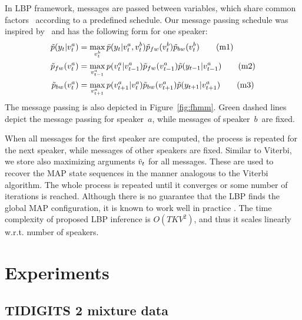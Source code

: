 \documentclass[a4paper]{article}
\newcommand{\spkrA}{a}
\newcommand{\spkrB}{b}
\def\p{{\bar p}}
\begin{document}
In LBP framework, messages are passed between variables, which share common factors~\cite{Bishop2006} according to a predefined schedule. Our message passing schedule was inspired by~\cite{Rennie2010} and has the following form for one speaker:
\begin{align*}
    \Tilde{p}(y_t | v_t^{\spkrA}) &= \max_{v_{t}^{\spkrB}}  \p(y_t | v_t^{\spkrA}, v_t^{\spkrB}) \Tilde{p}_{fw}(v_t^{\spkrB})     \Tilde{p}_{bw}(v_t^{\spkrB})          \tag{m1}\\
    \Tilde{p}_{fw}(v_t^{\spkrA})  &= \max_{v_{t-1}^{\spkrA}} p(v_t^{\spkrA} | v_{t-1}^{\spkrA}) \Tilde{p}_{fw}(v_{t-1}^{\spkrA}) \Tilde{p}(y_{t-1} | v_{t-1}^{\spkrA}) \tag{m2}\\
    \Tilde{p}_{bw}(v_t^{\spkrA})  &= \max_{v_{t+1}^{\spkrA}} p(v_{t+1}^{\spkrA} | v_t^{\spkrA}) \Tilde{p}_{bw}(v_{t+1}^{\spkrA}) \Tilde{p}(y_{t+1} | v_{t+1}^{\spkrA}) \tag{m3}\\
\end{align*}
The message passing is also depicted in Figure~\ref{fig:fhmm}. Green dashed lines depict the message passing for speaker~$\spkrA$, while messages of speaker~$\spkrB$~are fixed.

When all messages for the first speaker are computed, the process is repeated for the next speaker, while messages of other speakers are fixed.
Similar to Viterbi, we store also maximizing arguments $\Tilde{v}_t$ for all messages. These are used to recover the MAP state sequences in the manner analogous to the Viterbi algorithm. 
The whole process is repeated until it converges or some number of iterations is reached. Although there is no guarantee that the LBP finds the global MAP configuration, it is known to work well in practice \cite{weiss2001}.  The time complexity of proposed LBP inference is $O(TKV^2)$, and thus it scales linearly w.r.t. number of speakers.


%
%

\section{Experiments}
\label{sec:experiments}



\subsection{TIDIGITS 2 mixture data}
\label{sec:dataset}
\end{document}
